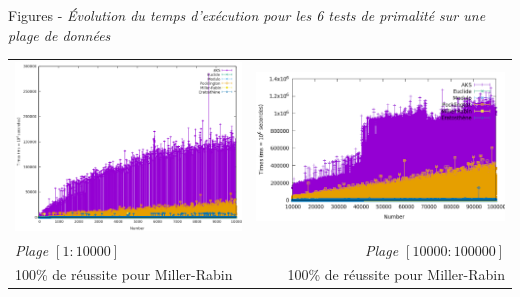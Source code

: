 		\begin{frame}
		\color{blue} Figures - \color{black}\textit{Évolution du temps d'exécution pour les 6 tests de primalité sur une plage de données}
		
		\footnotesize\begin{longtable}{l r}		
	\hspace{-2em} 
 		\includegraphics[scale=0.3]{RANGE.png}  & \includegraphics[scale=0.3]{RANGE2.png}\\
		 \textit{Plage $[1:10 000]$} & \textit{Plage $[10 000:100 000]$} \\
		 100\% de réussite pour Miller-Rabin &  100\% de réussite pour Miller-Rabin\\
	\end{longtable}
		\end{frame}
		
